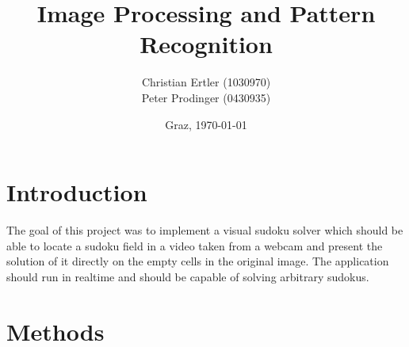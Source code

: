 \documentclass[
a4paper,     %
12pt         %
]{scrartcl}  %
\title{Image Processing and Pattern Recognition}
\author{Christian Ertler (1030970) \\ Peter Prodinger (0430935)}
\date{Graz, \today{}}
\begin{document}
\maketitle









\section{Introduction}

The goal of this project was to implement a visual sudoku solver which should be able
to locate a sudoku field in a video taken from a webcam and present the solution of it
directly on the empty cells in the original image. The application should run in realtime
and should be capable of solving arbitrary sudokus. 

\section{Methods}
\end{document}
